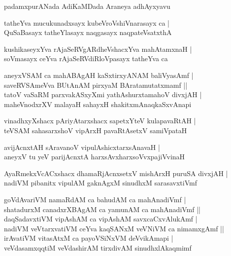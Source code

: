 \documentclass[twoside,12pt,openright]{book}
\newcounter{shloka}[chapter]
\begin{document}
\begin{center}
padamxpurANada AdiKaMDada Araneya adhAyxyavu
\end{center}

\begin{shloka}
tatheYva mucukunadxsayx kubeVroVshiVnarasayx ca |\\
QuSaBasayx tatheYlasayx naqgasayx naqpateVsatxthA
\end{shloka}

\begin{shloka}
kushikaseyxYva rAjaSeRVgARdheVshacxYva mahAtamxnaH |\\
soVmasayx ceYva rAjaSeRVdiRloVpasayx tatheYva ca
\end{shloka}

\begin{shloka}
aneyxVSAM ca mahABAgAH kaSxtirxyANAM baliVyasAmf |\\
saveRVSAmeVva BUtAnAM pirxyaM BAratamutatxmamf ||\\
tatoV vaSaRM parxvakASxyXmi yathAshurxtamahoV divxjAH |\\
maheVnodxrXV malayaH sahayxH shakitxmAnaqkaSxvAnapi
\end{shloka}

\begin{shloka}
vinadhxyXshacx pAriyAtarxshacx sapetxYteV kulapavaRtAH |\\
teVSAM sahasarxshoV vipArxH pavaRtAsetxV samiVpataH
\end{shloka}

\begin{shloka}
avijAcnxtAH sAravanoV vipulAshicxtarxsAnavaH |\\
aneyxV tu yeV parijAcnxtA harxsAvxharxsoVvxpajiVvinaH
\end{shloka}

\begin{shloka}
AyaRmekxVcACxshacx dhamaRjAcnxsetxV mishArxH puruSA divxjAH |\\
nadiVM pibanitx vipulAM gaknAgxM sinudhxM sarasavxtiVmf
\end{shloka}

\begin{shloka}
goVdAvariVM namaRdAM ca bahudAM ca mahAnadiVmf |\\
shatadurxM canadxrXBAgAM ca yamunAM ca mahAnadiVmf ||\\
daqSadavxtiVM vipAshAM ca vipAshAM savxcaCxvAlukAmf |\\
nadiVM veVtarxvatiVM ceYva kaqSANxM veVNiVM ca nimamxgAmf ||\\
irAvatiVM vitasAtxM ca payoVSiNxVM deVvikAmapi |\\
veVdasamxqqtiM veVdashirAM tirxdivAM sinudhxlAkaqmimf
\end{shloka}
\end{document}

